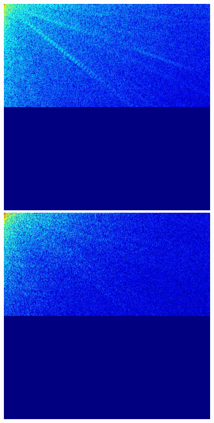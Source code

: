 \documentclass[12pt]{report}
\begin{document}
\begin{figure}[H]
\begin{center}
\includegraphics[scale=0.25]{../ImageRes/dct_masked2_0.jpg} 
\includegraphics[scale=0.25]{../ImageRes/dct_masked2_1.jpg} 

\end{center}
\end{figure}
\end{document}
